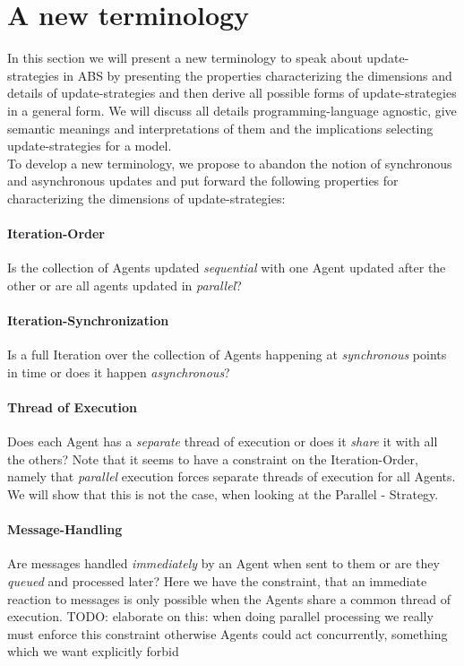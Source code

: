 \section{A new terminology}
In this section we will present a new terminology to speak about update-strategies in ABS by presenting the properties characterizing the dimensions and details of update-strategies and then derive all possible forms of update-strategies in a general form. We will discuss all details programming-language agnostic, give semantic meanings and interpretations of them and the implications selecting update-strategies for a model. \\
To develop a new terminology, we propose to abandon the notion of synchronous and asynchronous updates and put forward the following properties for characterizing the dimensions of update-strategies:

\paragraph{Iteration-Order}
Is the collection of Agents updated \textit{sequential} with one Agent updated after the other or are all agents updated in \textit{parallel}?

\paragraph{Iteration-Synchronization}
Is a full Iteration over the collection of Agents happening at \textit{synchronous} points in time or does it happen \textit{asynchronous}?

\paragraph{Thread of Execution}
Does each Agent has a \textit{separate} thread of execution or does it \textit{share} it with all the others? Note that it seems to have a constraint on the Iteration-Order, namely that \textit{parallel} execution forces separate threads of execution for all Agents. We will show that this is not the case, when looking at the Parallel - Strategy.

\paragraph{Message-Handling}
Are messages handled \textit{immediately} by an Agent when sent to them or are they \textit{queued} and processed later? Here we have the constraint, that an immediate reaction to messages is only possible when the Agents share a common thread of execution. TODO: elaborate on this: when doing parallel processing we really must enforce this constraint otherwise Agents could act concurrently, something which we want explicitly forbid

